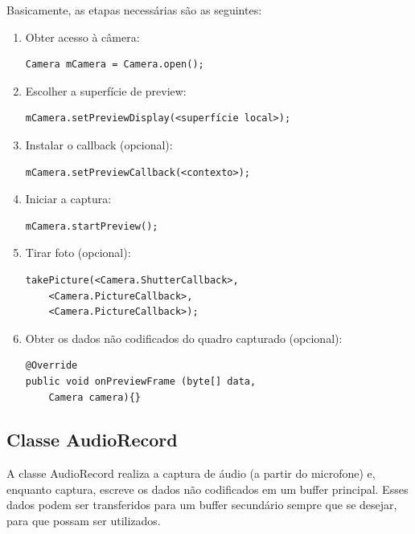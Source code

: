 \documentclass{acm_proc_article-sp}
\begin{document}
Basicamente, as etapas necessárias são as seguintes:
\begin{enumerate}
 \item Obter acesso à câmera:
  \begin{verbatim}
Camera mCamera = Camera.open();
  \end{verbatim}
 \item Escolher a superfície de preview:
  \begin{verbatim}
mCamera.setPreviewDisplay(<superfície local>);
  \end{verbatim}
 \item Instalar o callback (opcional):
  \begin{verbatim}
mCamera.setPreviewCallback(<contexto>);
  \end{verbatim}
 \item Iniciar a captura:
  \begin{verbatim}
mCamera.startPreview();
  \end{verbatim}
 \item Tirar foto (opcional):
  \begin{verbatim}
takePicture(<Camera.ShutterCallback>,
    <Camera.PictureCallback>,
    <Camera.PictureCallback>);
  \end{verbatim}
 \item Obter os dados não codificados do quadro capturado (opcional):
  \begin{verbatim}
@Override
public void onPreviewFrame (byte[] data, 
    Camera camera){}
  \end{verbatim}
\end{enumerate}


\subsection{Classe AudioRecord}
A classe AudioRecord realiza a captura de áudio (a partir do microfone) e, enquanto captura, escreve os dados não codificados em um buffer principal. Esses dados podem ser transferidos para um buffer secundário sempre que se desejar, para que possam ser utilizados.
\end{document}
